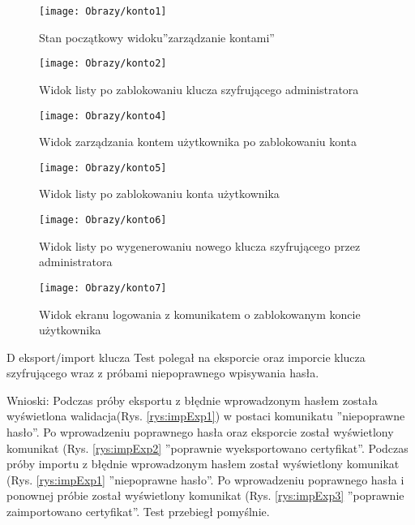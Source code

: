 \begin{enumerate*}
		
				\begin{figure}[ht!]
					\begin{minipage}{0.2\textwidth}
						\texttt{[image: Obrazy/konto1]}
						\caption{Stan początkowy widoku''zarządzanie kontami'' }
						\label{rys:zarzadzanieKontem1}
					\end{minipage}
				\begin{minipage}{0.2\textwidth}
					\texttt{[image: Obrazy/konto2]}
					\caption{Widok listy po zablokowaniu klucza szyfrującego administratora }
					\label{rys:zarzadzanieKontem2}
				\end{minipage}
			
		
			
			\begin{minipage}{0.2\textwidth}
				\texttt{[image: Obrazy/konto4]}
				\caption{Widok zarządzania kontem użytkownika po zablokowaniu konta }
				\label{rys:zarzadzanieKontem4}
			\end{minipage}
			
			
			\begin{minipage}{0.2\textwidth}
				\texttt{[image: Obrazy/konto5]}
				\caption{Widok listy po zablokowaniu konta użytkownika}
				\label{rys:zarzadzanieKontem5}
			\end{minipage}
		
		
			\begin{minipage}{0.2\textwidth}
			\texttt{[image: Obrazy/konto6]}
			\caption{Widok listy po wygenerowaniu nowego klucza szyfrującego przez administratora}
			\label{rys:zarzadzanieKontem6}
		\end{minipage}
	
		\begin{minipage}{0.2\textwidth}
		\texttt{[image: Obrazy/konto7]}
		\caption{Widok ekranu logowania z komunikatem o zablokowanym koncie użytkownika}
		\label{rys:zarzadzanieKontem7}
	\end{minipage}

			
		\end{figure}
		
	\item  D eksport/import klucza
	Test polegał na eksporcie oraz imporcie klucza szyfrującego wraz z próbami niepoprawnego wpisywania hasła.
	
	Wnioski: Podczas próby eksportu z błędnie wprowadzonym hasłem została wyświetlona walidacja(Rys. \ref{rys:impExp1}) w postaci komunikatu ''niepoprawne hasło''. Po wprowadzeniu poprawnego hasła oraz eksporcie został wyświetlony komunikat (Rys. \ref{rys:impExp2} ''poprawnie wyeksportowano certyfikat''. Podczas próby importu z błędnie wprowadzonym hasłem został wyświetlony komunikat (Rys. \ref{rys:impExp1} ''niepoprawne hasło''. Po wprowadzeniu poprawnego hasła i ponownej próbie został wyświetlony komunikat (Rys. \ref{rys:impExp3} ''poprawnie zaimportowano certyfikat''. Test przebiegł pomyślnie.
	

\end{enumerate*}
